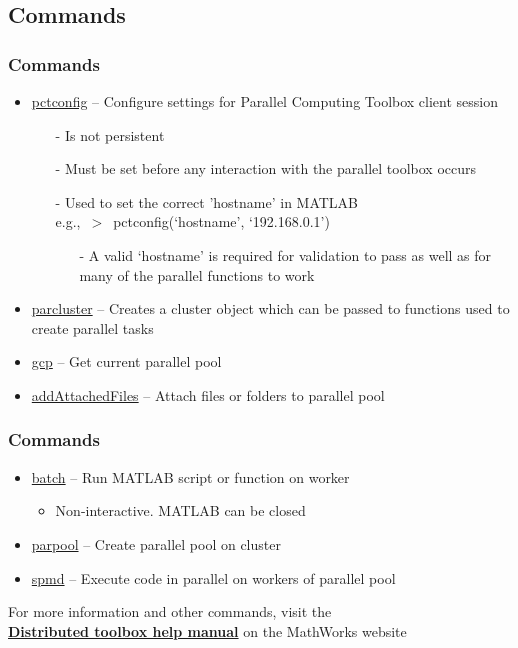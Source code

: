 \documentclass[t]{beamer}
\begin{document}
\subsection{Commands}
\begin{frame}
\frametitle{Commands}
\begin{itemize}
\item \href{http://www.mathworks.com/help/distcomp/pctconfig.html}{pctconfig} -- Configure settings for Parallel Computing Toolbox client session
  \begin{itemize}
  \item[-] Is not persistent
  \item[-] Must be set before any interaction with the parallel toolbox occurs
  \item[-] Used to set the correct 'hostname' in MATLAB\\e.g.,~$>$~pctconfig(`hostname', `192.168.0.1')
		\begin{itemize}
		\item[-] A valid `hostname' is required for validation to pass as well as for many of the parallel functions to work
		\end{itemize}
  \end{itemize}
\item \href{http://www.mathworks.com/help/distcomp/parcluster.html}{parcluster} -- Creates a cluster object which can be passed to functions used to create parallel tasks
\item \href{http://www.mathworks.com/help/distcomp/gcp.html}{gcp} -- Get current parallel pool
\item \href{http://www.mathworks.com/help/distcomp/addattachedfiles.html}{addAttachedFiles} -- Attach files or folders to parallel pool
\end{itemize}
\end{frame}


\begin{frame}
	\frametitle{Commands}
	\begin{itemize}
	\item \href{http://www.mathworks.com/help/distcomp/batch.html}{batch} -- Run MATLAB script or function on worker
		\begin{itemize}
		\item Non-interactive.  MATLAB can be closed
		\end{itemize}
	\item \href{http://www.mathworks.com/help/distcomp/parpool.html}{parpool} -- Create parallel pool on cluster
	\item \href{http://www.mathworks.com/help/distcomp/spmd.html}{spmd} -- Execute code in parallel on workers of parallel pool
	\end{itemize}
	For more information and other commands, visit the\\\href{http://www.mathworks.com/help/distcomp}{\textbf{Distributed toolbox help manual}} on the MathWorks website
\end{frame}
\end{document}
